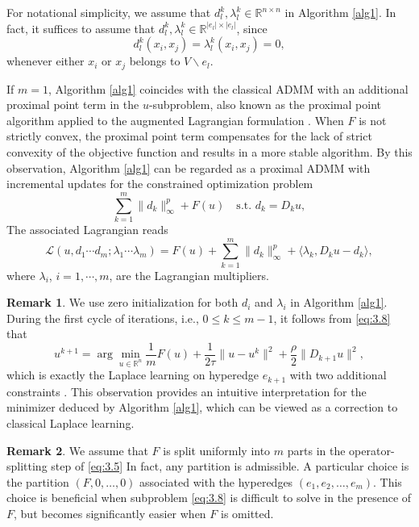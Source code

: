 \documentclass{article}
\theoremstyle{definition}
\newtheorem{remark}{Remark}
\begin{document}
For notational simplicity, we assume that $d_l^k, \lambda_l^k\in\mathbb{R}^{n\times n}$ in Algorithm \ref{alg1}. In fact, it suffices to assume that $d_l^k, \lambda_l^k\in\mathbb{R}^{|e_l|\times |e_l|}$, since
\begin{equation}\label{eq:alg1}
  d_l^k(x_i,x_j)=\lambda_l^k(x_i,x_j)=0,
\end{equation}
whenever either $x_i$ or $x_j$ belongs to $V\backslash e_l$.

If $m = 1$, Algorithm \ref{alg1} coincides with the classical ADMM with an additional proximal point term in the $u$-subproblem, also known as the proximal point algorithm applied to the augmented Lagrangian formulation \cite{rockafellar1976augmented,zhang2011unified}.
When $F$ is not strictly convex, the proximal point term compensates for the lack of strict convexity of the objective function and results in a more stable algorithm.
By this observation, Algorithm \ref{alg1} can be regarded as a proximal ADMM with incremental updates
for the constrained optimization problem
\begin{equation}\label{eq:3.7a}
  \sum_{k=1}^{m}\|d_k\|_\infty^p + F(u) \quad \mbox{s.t. } d_k=D_ku,
\end{equation}
The associated Lagrangian reads
\begin{equation}\label{eq:Lagrangian}
  \mathcal{L}(u,d_1\cdots d_m;\lambda_1\cdots \lambda_m)
  =F(u) + \sum_{k=1}^{m}\|d_k\|_\infty^p + \langle \lambda_k, D_ku-d_k \rangle,
\end{equation}
where $\lambda_i$, $i=1,\cdots, m$, are the Lagrangian multipliers.


\begin{remark}\label{remark:1}
We use zero initialization for both $d_i$ and $\lambda_i$ in Algorithm \ref{alg1}.
During the first cycle of iterations, i.e., $0\leq k\leq m-1$,
it follows from \eqref{eq:3.8} that
  \[
  u^{k+1}=\arg\min_{u\in\mathbb{R}^n}
  \frac{1}{m} F(u)
  +\frac{1}{2\tau} \|u-u^k\|^2+\frac{\rho}{2}\|D_{k+1}u\|^2,
  \]
which is exactly the Laplace learning on hyperedge $e_{k+1}$ with two additional constraints \cite{zhu2003semi}.
This observation provides an intuitive interpretation for the minimizer deduced by Algorithm \ref{alg1}, which can be viewed as a correction to classical Laplace learning.
\end{remark}


\begin{remark}\label{re:2}
  We assume that $F$ is split uniformly into $m$ parts in the operator-splitting step of \eqref{eq:3.5} In fact, any partition is admissible.
  A particular choice is the partition $(F, 0, \dots, 0)$ associated with the hyperedges $(e_1, e_2, \dots, e_m)$.
  This choice is beneficial when subproblem \eqref{eq:3.8} is difficult to solve in the presence of $F$, but becomes significantly easier when $F$ is omitted.
\end{remark}
\end{document}
